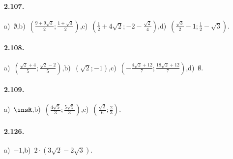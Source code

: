 \paragraph{2.107.}
a)~$\emptyset$,\quad b)~$(\frac{9+9\sqrt 3} 2;\frac{1+\sqrt 3} 2)$,\quad c)~$(\frac 1 2+4\sqrt 2;-2-\frac{\sqrt 2} 4)$,\quad d)~$(\frac{\sqrt 3} 2-1;\frac 1 2-\sqrt 3)$.

\paragraph{2.108.}
a)~$(\frac{\sqrt 2+4} 5;\frac{\sqrt 2-2} 5)$,\quad b)~$(\sqrt 2;-1)$,\quad c)~$(-\frac{4\sqrt 2+12} 7;\frac{18\sqrt 2+12} 7)$,\quad d)~$\emptyset$.

\paragraph{2.109.}
a)~$\insR$,\quad b)~$(\frac{4\sqrt 5} 3;\frac{5\sqrt 5} 3)$,\quad c)~$(\frac{\sqrt 2} 6;\frac 2 3)$.
\paragraph{2.126.}
a)~$-1$,\quad b)~$2\cdot (3\sqrt 2-2\sqrt 3)$.

